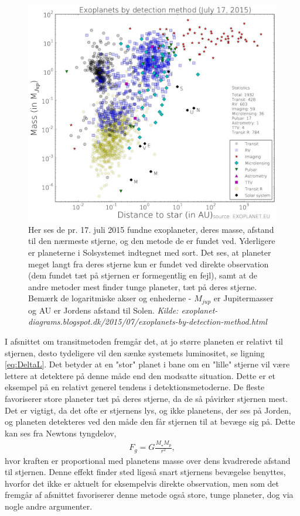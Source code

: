 \begin{figure}[h!]
    \centering
    \includegraphics[width=.8\textwidth]{Astrofysik/billeder/sammenligning.PNG}
    \caption{Her ses de pr. 17. juli 2015 fundne exoplaneter, deres masse, afstand til den nærmeste stjerne, og den metode de er fundet ved. Yderligere er planeterne i Solsystemet indtegnet med sort. Det ses, at planeter meget langt fra deres stjerne kun er fundet ved direkte observation (dem fundet tæt på stjernen er formegentlig en fejl), samt at de andre metoder mest finder tunge planeter, tæt på deres stjerne. Bemærk de logaritmiske akser og enhederne - $M_{jup}$ er Jupitermasser og AU er Jordens afstand til Solen. \emph{Kilde: exoplanet-diagrams.blogspot.dk/2015/07/exoplanets-by-detection-method.html}}
    \label{fig:sammenligning}
\end{figure}

I afsnittet om transitmetoden fremgår det, at jo større planeten er relativt til stjernen, desto tydeligere vil den sænke systemets luminositet, se ligning \ref{eq:DeltaL}. Det betyder at en "stor" planet i bane om en "lille" stjerne vil være lettere at detektere på denne måde end den modsatte situation. Dette er et eksempel på en relativt generel tendens i detektionsmetoderne. De fleste favoriserer store planeter tæt på deres stjerne, da de så påvirker stjernen mest. Det er vigtigt, da det ofte er stjernens lys, og ikke planetens, der ses på Jorden, og planeten detekteres ved den måde den får stjernen til at bevæge sig på. Dette kan ses fra Newtons tyngdelov,
\begin{align} \label{eq:FgNewton}
    F_g = G \frac{M_\star M_p}{r^2},
\end{align}
hvor kraften er proportional med planetens masse over dens kvadrerede afstand til stjernen. Denne effekt finder sted ligeså snart stjernens bevægelse benyttes, hvorfor det ikke er aktuelt for eksempelvis direkte observation, men som det fremgår af afsnittet favoriserer denne metode også store, tunge planeter, dog via nogle andre argumenter. \\

